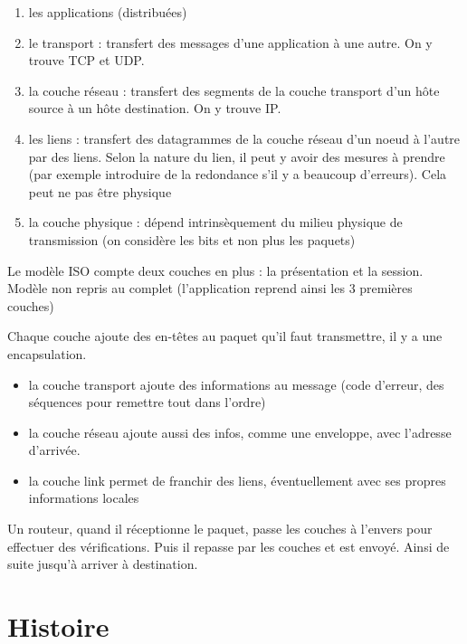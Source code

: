 \begin{enumerate}
	\item les applications (distribuées)
	\item le transport : transfert des messages d'une application à une autre. On y trouve TCP et UDP.
	
	\item la couche réseau : transfert des segments de la couche transport d'un hôte source à un hôte destination. On y trouve IP.
	
	\item les liens : transfert des datagrammes de la couche réseau d'un noeud à l'autre par des liens. Selon la nature du lien, il peut y avoir des mesures à prendre (par exemple introduire de la redondance s'il y a beaucoup d'erreurs). Cela peut ne pas être physique
	\item la couche physique : dépend intrinsèquement du milieu physique de transmission (on considère les bits et non plus les paquets)
\end{enumerate}


Le modèle ISO compte deux couches en plus : la présentation et la session. Modèle non repris au complet (l'application reprend ainsi les 3 premières couches)

Chaque couche ajoute des en-têtes au paquet qu'il faut transmettre, il y a une encapsulation.

\begin{itemize}

	\item la couche transport ajoute des informations au message (code d'erreur, des séquences pour remettre tout dans l'ordre)
	\item la couche réseau ajoute aussi des infos, comme une enveloppe, avec l'adresse d'arrivée.
	\item la couche link permet de franchir des liens, éventuellement avec ses propres informations locales
\end{itemize}




Un routeur, quand il réceptionne le paquet, passe les couches à l'envers pour effectuer des vérifications. Puis il repasse par les couches et est envoyé. Ainsi de suite jusqu'à arriver à destination.	

\section{Histoire}
